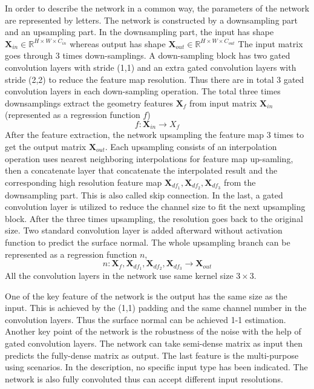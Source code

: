 In order to describe the network in a common way, the parameters of the network are represented by letters.
The network is constructed by a downsampling part and an upsampling part. In the downsampling part, the input has shape $ \textbf{X}_{in} \in \mathbb{R}^{H\times W\times C_{in}}$ whereas output has shape $ \textbf{X}_{out} \in \mathbb{R}^{H\times W\times C_{out}}$
The input matrix goes through 3 times down-samplings. A down-sampling block has two gated convolution layers with stride (1,1) and an extra gated convolution layers with stride (2,2) to reduce the feature map resolution. Thus there are in total 3 gated convolution layers in each down-sampling operation.
The total three times downsamplings extract the geometry features $ \textbf{X}_f $ from input matrix $ \textbf{X}_{in} $ (represented as a regression function $ f $)
\[ f: \textbf{X}_{in} \rightarrow X_f \]
After the feature extraction, the network upsampling the feature map 3 times to get the output matrix $ \textbf{X}_{out} $. Each upsampling consists of an interpolation operation uses nearest neighboring interpolations for feature map up-samling, then a concatenate layer that concatenate the interpolated result and the corresponding high resolution feature map  $ \textbf{X}_{df_1}, \textbf{X}_{df_2}, \textbf{X}_{df_3} $  from the downsampling part. This is also called skip connection. In the last, a gated convolution layer is utilized to reduce the channel size to fit the next upsampling block. After the three times upsampling, the resolution goes back to the original size. Two standard convolution layer is added afterward without activation function to predict the surface normal. The whole upsampling branch can be represented as a regression function $ n $,
\[ n: \textbf{X}_f, \textbf{X}_{df_1}, \textbf{X}_{df_2}, \textbf{X}_{df_3} \rightarrow \textbf{X}_{out} \]
All the convolution layers in the network use same kernel size $ 3\times 3 $. 

One of the key feature of the network is the output has the same size as the input. This is achieved by the (1,1) padding and the same channel number in the convolution layers. Thus the surface normal can be achieved 1-1 estimation. Another key point of the network is the robustness of the noise with the help of gated convolution layers. The network can take semi-dense matrix as input then predicts the fully-dense matrix as output. The last feature is the multi-purpose using scenarios. In the description, no specific input type has been indicated. 
The network is also fully convoluted thus can accept different input resolutions. 


